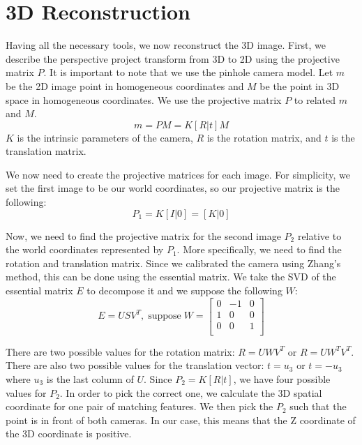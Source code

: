 \section{3D Reconstruction}
\label{s:reconstruction}
Having all the necessary tools, we now reconstruct the 3D image. First, we describe the perspective project transform from 3D to 2D using the projective matrix $P$. It is important to note that we use the pinhole camera model. Let $m$ be the 2D image point in homogeneous coordinates and $M$ be the point in 3D space in homogeneous coordinates. We use the projective matrix $P$ to related $m$ and $M$.
\begin{equation}
m = PM = K[R | t]M
\end{equation}
$K$ is the intrinsic parameters of the camera, $R$ is the rotation matrix, and $t$ is the translation matrix.

We now need to create the projective matrices for each image. For simplicity, we set the first image to be our world coordinates, so our projective matrix is the following:
\begin{equation}
P_1 = K[I | 0] = [K | 0]
\end{equation}

Now, we need to find the projective matrix for the second image $P_2$ relative to the world coordinates represented by $P_1$. More specifically, we need to find the rotation and translation matrix. Since we calibrated the camera using Zhang's method, this can be done using the essential matrix. We take the SVD of the essential matrix $E$ to decompose it and we suppose the following $W$:
\begin{equation*}
E = USV^T, \; \text{suppose} \; W =
  \left[ {\begin{array}{ccc}
   0 & -1 & 0  \\
  1 & 0 & 0 \\
   0 & 0 & 1 \\
  \end{array} } \right]
\end{equation*}

There are two possible values for the rotation matrix: $R=UWV^T$ or $R=UW^TV^T$. There are also two possible values for the translation vector: $t = u_3$ or $t=-u_3$ where $u_3$ is the last column of $U$. Since $P_2 = K[R |t]$, we have four possible values for $P_2$. In order to pick the correct one, we calculate the 3D spatial coordinate for one pair of matching features. We then pick the $P_2$ such that the point is in front of both cameras. In our case, this means that the Z coordinate of the 3D coordinate is positive. 

